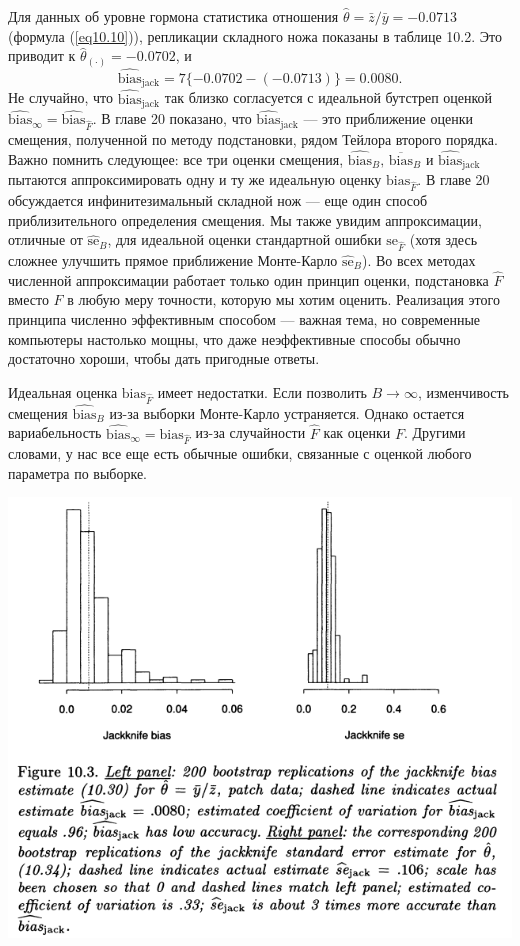 Для данных об уровне гормона статистика отношения $\hat{\theta} = \bar{z}/\bar{y} = -0.0713$ (формула (\ref{eq10.10})), репликации складного ножа показаны в таблице 10.2. Это приводит к $\hat{\theta}_{(\cdot)} = -0.0702$, и
\begin{equation}\label{eq10.32}
    \widehat{\text{bias}}_{\text{jack}} = 7\{-0.0702 - ( -0.0713)\} = 0.0080.
\end{equation}
Не случайно, что $\widehat{\text{bias}}_{\text{jack}}$ так близко согласуется с идеальной бутстреп оценкой $\widehat{\text{bias}}_{\infty} = \widehat{\text{bias}}_{\hat{F}}$. В главе 20 показано, что $\widehat{\text{bias}}_{\text{jack}}$ --- это приближение оценки смещения, полученной по методу подстановки, рядом Тейлора второго порядка. Важно помнить следующее: все три оценки смещения, $\widehat{\text{bias}}_{B},\, \overline{\text{bias}}_{B}$ и $\widehat{\text{bias}}_{\text{jack}}$ пытаются аппроксимировать одну и ту же идеальную оценку $\text{bias}_{\hat{F}}$. В главе 20 обсуждается инфинитезимальный складной нож --- еще один способ приблизительного определения смещения. Мы также увидим аппроксимации, отличные от $\widehat{\text{se}}_{B}$, для идеальной оценки стандартной ошибки $\text{se}_{\hat{F}}$ (хотя здесь сложнее улучшить прямое приближение Монте-Карло $\widehat{\text{se}}_{B}$). Во всех методах численной аппроксимации работает только один принцип оценки, подстановка $\hat{F}$ вместо $F$ в любую меру точности, которую мы хотим оценить. Реализация этого принципа численно эффективным способом --- важная тема, но современные компьютеры настолько мощны, что даже неэффективные способы обычно достаточно хороши, чтобы дать пригодные ответы.

Идеальная оценка $\text{bias}_{\hat{F}}$ имеет недостатки. Если позволить $B \rightarrow \infty$, изменчивость смещения $\widehat{\text{bias}}_{B}$ из-за выборки Монте-Карло устраняется. Однако остается вариабельность $\widehat{\text{bias}}_{\infty} = \text{bias}_{\hat{F}}$ из-за случайности $\hat{F}$ как оценки $F$. Другими словами, у нас все еще есть обычные ошибки, связанные с оценкой любого параметра по выборке.

\noindent
\includegraphics[width=\linewidth]{10/f10.3.png}

